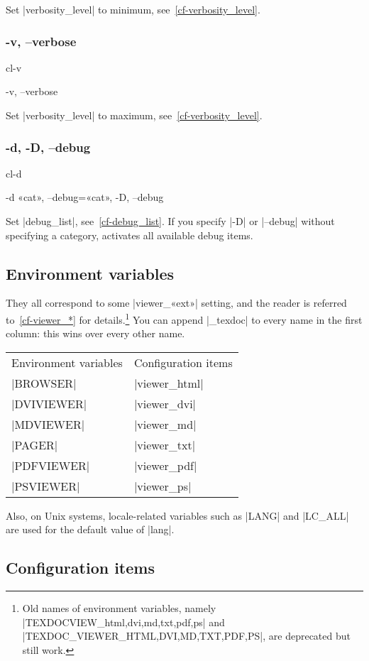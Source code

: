 \documentclass[a4paper, oneside]{scrartcl}
\newif\ifframed
\newenvironment{cmdsubsub}[2]{%
  \framedfalse \commandes\subsubsection{#1}{#2}%
  }{%
  \endcommandes}
\begin{document}
Set |verbosity_level| to minimum, see~\ref{cf-verbosity_level}.

\begin{cmdsubsub}{-v, --verbose}{cl-v}
  -v, --verbose
\end{cmdsubsub}

Set |verbosity_level| to maximum, see~\ref{cf-verbosity_level}.

\begin{cmdsubsub}{-d, -D, --debug}{cl-d}
  -d «cat», --debug=«cat», -D, --debug
\end{cmdsubsub}

Set |debug_list|, see~\ref{cf-debug_list}. If you specify |-D| or |--debug|
without specifying a category, activates all available debug items.

\subsection{Environment variables}\label{ss-envvar}

They all correspond to some |viewer_«ext»| setting, and the reader is referred
to~\ref{cf-viewer_*} for details.\footnote{Old names of environment variables,
namely |TEXDOCVIEW_{html,dvi,md,txt,pdf,ps}| and
|TEXDOC_VIEWER_{HTML,DVI,MD,TXT,PDF,PS}|, are deprecated but still work.} You can
append |_texdoc| to every name in the first column: this wins over every other
name.

\begin{center}
\begin{tabular}{ll}
Environment variables & Configuration items \\
|BROWSER|             & |viewer_html|       \\
|DVIVIEWER|           & |viewer_dvi|        \\
|MDVIEWER|            & |viewer_md|         \\
|PAGER|               & |viewer_txt|        \\
|PDFVIEWER|           & |viewer_pdf|        \\
|PSVIEWER|            & |viewer_ps|         \\
\end{tabular}
\end{center}

Also, on Unix systems, locale-related variables such as |LANG| and |LC_ALL|
are used for the default value of |lang|.

\subsection{Configuration items}\label{ss-conf}
\end{document}
